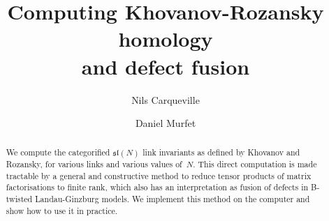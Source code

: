 \documentclass{compositio}
\theoremstyle{definition}
\numberwithin{equation}{section}
\def\res{\operatorname{Res}}
\begin{document}
\def\Res{\res\!}
\newcommand{\cat}[1]{\mathcal{#1}}
\newcommand{\lto}{\longrightarrow}
\newcommand{\xlto}[1]{\stackrel{#1}\lto}
\newcommand{\mf}[1]{\mathfrak{#1}}
\newcommand{\md}[1]{\mathscr{#1}}
\newcommand{\intvar}{\bs{x}_{\textup{int}}}
\newcommand{\extvar}{\bs{x}_{\textup{ext}}}
\newcommand{\qderu}[2]{\mathbf{D}^{#1}(#2)}
\newcommand{\ud}{\mathrm{d}}
\def\l{\,|\,}
\def\cf{\boldsymbol{cf}}
\def\bx{\boldsymbol{x}}
\def\by{\boldsymbol{y}}
\def\ba{\boldsymbol{a}}
\def\bb{\boldsymbol{b}}
\def\totimes{\otimes}
\def\di{Q}
\newcommand{\cotimes}[1]{\,\widehat{\otimes}_{#1}\,}
\def\QQ{\mathds{Q}}
\def\krc{C}
\def\diffm{d}
\def\diffh{d_{\chi}}
\def\redh{\overline{H}}
\def\ZZ{\mathds{Z}}
\def\bs{\boldsymbol}
\def\Ztwo{\mathds{Z}_2}
\def\mdual{^{\vee}}
\def\KR{\operatorname{KR}}
\def\I{\!\operatorname{i}\!}
\def\E{\operatorname{e}\!}
\def\sln{\mathfrak{sl}(N)}
\def\nN{\mathds{N}}
\def\nZ{\mathds{Z}}
\def\nQ{\mathds{Q}}
\def\nR{\mathds{R}}
\def\nC{\mathds{C}}
\def\idem{\epsilon}
\def\Xcirc{%
\begin{tikzpicture}[inner sep=0mm]
\node (X) at (0,0) {$X$};
\node (0) at (0,0) [circle,inner sep=0.99pt, thin,draw=black,fill= white] {};
\end{tikzpicture}%
}
\def\Xbul{%
\begin{tikzpicture}[inner sep=0mm]
\node (X) at (0,0) {$X$};
\node (0) at (0,0) [circle,inner sep=0.99pt, thin,draw=black,fill= black] {};
\end{tikzpicture}%
}

\title{Computing Khovanov-Rozansky homology \\ and defect fusion}
\author{Nils Carqueville}
\address{Arnold Sommerfeld Center for Theoretical Physics, LMU M\"unchen \& Excellence Cluster Universe}

\author{Daniel Murfet}
\address{Department of Mathematics, UCLA}


\begin{abstract}
We compute the categorified $\sln$ link invariants as defined by Khovanov and Rozansky, for various links and various values of~$N$. This direct computation is made tractable by a general and constructive method to reduce tensor products of matrix factorisations to finite rank, which also has an interpretation as fusion of defects in B-twisted Landau-Ginzburg models. We implement this method on the computer and show how to use it in practice. 
\end{abstract}
\end{document}
